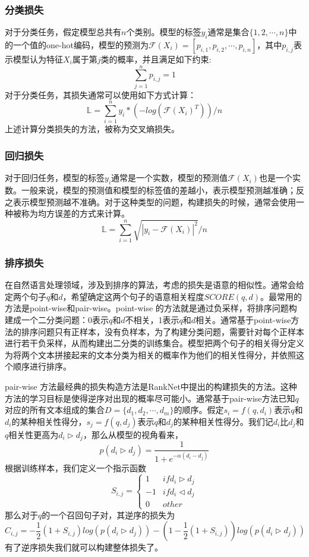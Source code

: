 \documentclass[twoside,a4paper,12pt]{book}%
\begin{document}
\subsubsection{分类损失}
对于分类任务，假定模型总共有$n$个类别。模型的标签$y_i$通常是集合$\{1,2,\cdots,n\}$中的一个值的one-hot编码，模型的预测为$\mathcal{F}(X_i)=[p_{i,1},p_{i,2},\cdots,p_{i,n}]$，其中$p_{i,j}$表示模型认为特征$X_i$属于第$j$类的概率，并且满足如下约束:
$$
\sum_{j=1}^{n}p_{i,j}=1
$$
对于分类任务，其损失通常可以使用如下方式计算：
$$
\mathbb{L}=\sum_{i=1}^{n}{y_i*(-log(\mathcal{F}(X_i)^T))}/n
$$
上述计算分类损失的方法，被称为交叉熵损失。
\subsubsection{回归损失}
对于回归任务，模型的标签$y_i$通常是一个实数，模型的预测值$\mathcal{F}(X_i)$也是一个实数。一般来说，模型的预测值和模型的标签值的差越小，表示模型预测越准确；反之表示模型预测越不准确。对于这种类型的问题，构建损失的时候，通常会使用一种被称为均方误差的方式来计算。
$$
\mathbb{L}=\sum_{i=1}^{n}{\sqrt{|y_i-\mathcal{F}(X_i)|^2}}/n
$$
\subsubsection{排序损失}
在自然语言处理领域，涉及到排序的算法，考虑的损失是语意的相似性。通常会给定两个句子$q$和$d$，希望确定这两个句子的语意相关程度$SCORE(q,d)$。最常用的方法是point-wise和pair-wise。point-wise 的方法就是通过负采样，将排序问题构建成一个二分类问题：0表示$q$和$d$不相关，1表示$q$和$d$相关。通常基于point-wise方法的排序问题只有正样本，没有负样本，为了构建分类问题，需要针对每个正样本进行若干负采样，从而构建出二分类的训练集合。模型把两个句子的相关得分定义为将两个文本拼接起来的文本分类为相关的概率作为他们的相关性得分，并依照这个顺序进行排序。

pair-wise 方法最经典的损失构造方法是RankNet中提出的构建损失的方法。这种方法的学习目标是使得逆序对出现的概率尽可能小。通常基于pair-wise方法已知$q$对应的所有文本组成的集合$D=\{d_1,d_2,\cdots,d_m\}$的顺序。假定$s_i=f(q,d_i)$表示$q$和$d_i$的某种相关性得分，$s_j=f(q,d_j)$表示$q$和$d_j$的某种相关性得分。我们记$d_i$比$d_j$和$q$相关性更高为$d_i\triangleright d_j$，那么从模型的视角看来，
$$
p(d_i\triangleright d_j)=\frac{1}{1+e^{-\alpha(d_i-d_j)}}
$$
根据训练样本，我们定义一个指示函数
$$
S_{i,j}=
    \begin{cases}
        1   & if d_i \triangleright d_j\\
        -1  & if d_i \triangleleft d_j\\
        0   & other
    \end{cases}  
$$
那么对于$q$的一个召回句子对，其逆序的损失为
$$
C_{i,j}=-\frac{1}{2}(1+S_{i,j})log(p(d_i\triangleright d_j))-
(1-\frac{1}{2}(1+S_{i,j}))log(p(d_i\triangleright d_j))
$$
有了逆序损失我们就可以构建整体损失了。
\end{document}
